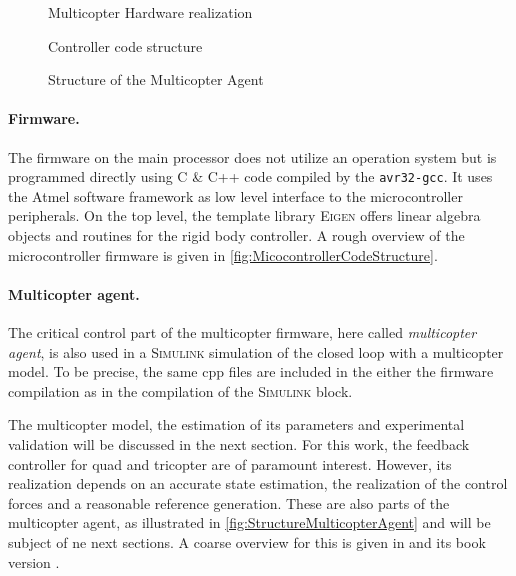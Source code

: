 \begin{figure}[p]
 \centering
 \footnotesize
 \newcommand{\macGroundstation}{\textcolor{white}{\textbf{Groundstation} (Win7 PC)}}
 \newcommand{\macMulticopterRealization}{\textcolor{white}{\textbf{Multicopter}}}
 \newcommand{\macRBSI}{\textcolor{white}{\textbf{rigid}}}
 \newcommand{\macRBSII}{\textcolor{white}{\textbf{body}}}
 \newcommand{\macRBSIII}{\textcolor{white}{\textbf{system}}}
 \newcommand{\macMCI}{\textcolor{white}{\textbf{main}}}
 \newcommand{\macMCII}{\textcolor{white}{\textbf{controller}}}
 
 \vspace{-2mm}
 \caption{Multicopter Hardware realization}
 \label{fig:MulticopterRealizationOverview}
 \vspace{5mm}
 
 \vspace{-1mm}
 \caption{Controller code structure}
 \label{fig:MicocontrollerCodeStructure}
 \vspace{5mm}
 \footnotesize
 
 \caption{Structure of the Multicopter Agent}
 \label{fig:StructureMulticopterAgent}
\end{figure}


\paragraph{Firmware.}
The firmware on the main processor does not utilize an operation system but is programmed directly using C \& C++ code compiled by the \texttt{avr32-gcc}.
It uses the Atmel software framework as low level interface to the microcontroller peripherals.
On the top level, the template library \textsc{Eigen} offers linear algebra objects and routines for the rigid body controller.
A rough overview of the microcontroller firmware is given in \autoref{fig:MicocontrollerCodeStructure}.

\paragraph{Multicopter agent.}
The critical control part of the multicopter firmware, here called \textit{multicopter agent}, is also used in a \textsc{Simulink} simulation of the closed loop with a multicopter model.
To be precise, the same cpp files are included in the either the firmware compilation as in the compilation of the \textsc{Simulink} block. 

The multicopter model, the estimation of its parameters and experimental validation will be discussed in the next section.
For this work, the feedback controller for quad and tricopter are of paramount interest.
However, its realization depends on an accurate state estimation, the realization of the control forces and a reasonable reference generation.
These are also parts of the multicopter agent, as illustrated in \autoref{fig:StructureMulticopterAgent} and will be subject of ne next sections.
A coarse overview for this is given in  \cite{Konz:Mechatronics} and its book version \cite{Konz:MechatronicsBook}.